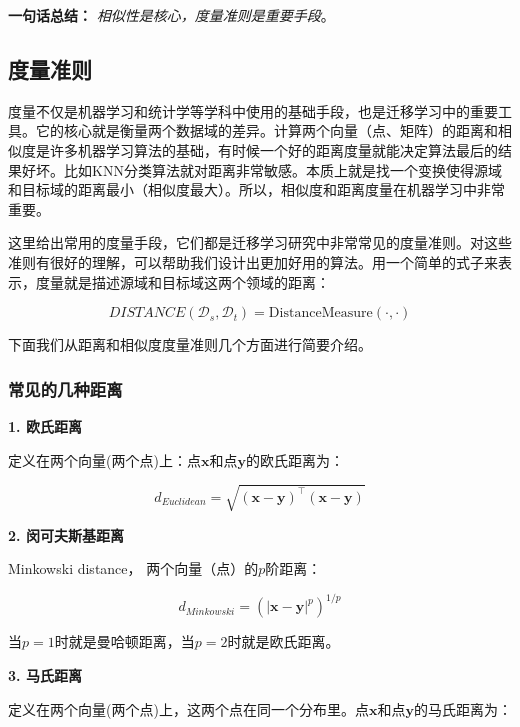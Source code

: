 \textbf{一句话总结：} \textit{相似性是核心，度量准则是重要手段}。

\subsection{度量准则}

度量不仅是机器学习和统计学等学科中使用的基础手段，也是迁移学习中的重要工具。它的核心就是衡量两个数据域的差异。计算两个向量（点、矩阵）的距离和相似度是许多机器学习算法的基础，有时候一个好的距离度量就能决定算法最后的结果好坏。比如KNN分类算法就对距离非常敏感。本质上就是找一个变换使得源域和目标域的距离最小（相似度最大）。所以，相似度和距离度量在机器学习中非常重要。

这里给出常用的度量手段，它们都是迁移学习研究中非常常见的度量准则。对这些准则有很好的理解，可以帮助我们设计出更加好用的算法。用一个简单的式子来表示，度量就是描述源域和目标域这两个领域的距离：

\begin{equation}
	\label{eq-distance}
	DISTANCE(\mathcal{D}_s,\mathcal{D}_t) = \mathrm{DistanceMeasure}(\cdot,\cdot)
\end{equation}

下面我们从距离和相似度度量准则几个方面进行简要介绍。

\subsubsection{常见的几种距离}

\textbf{1. 欧氏距离}

定义在两个向量(两个点)上：点$\mathbf{x}$和点$\mathbf{y}$的欧氏距离为：

\begin{equation}
	\label{eq-dist-eculidean}
	d_{Euclidean}=\sqrt{(\mathbf{x}-\mathbf{y})^\top (\mathbf{x}-\mathbf{y})}
\end{equation}


\textbf{2. 闵可夫斯基距离} 

Minkowski distance， 两个向量（点）的$p$阶距离：

\begin{equation}
	\label{eq-dist-minkowski}
	d_{Minkowski}=(|\mathbf{x}-\mathbf{y}|^p)^{1/p}
\end{equation}

当$p=1$时就是曼哈顿距离，当$p=2$时就是欧氏距离。

\textbf{3. 马氏距离}

定义在两个向量(两个点)上，这两个点在同一个分布里。点$\mathbf{x}$和点$\mathbf{y}$的马氏距离为：

